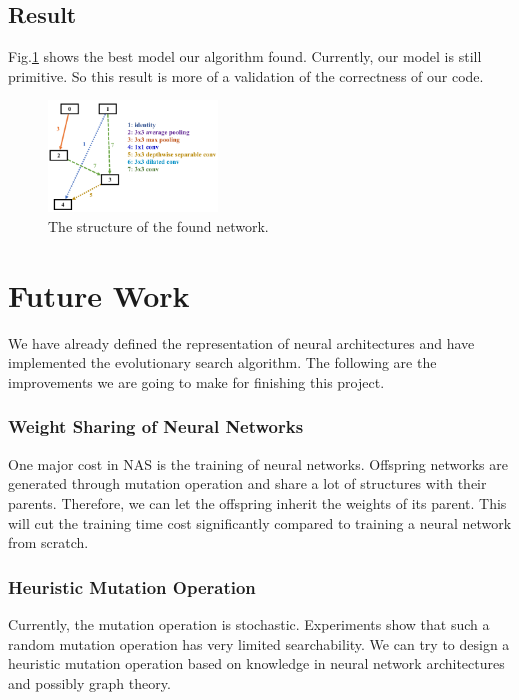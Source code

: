 \documentclass[conference]{IEEEtran}
\begin{document}
 \subsection{Result}

 Fig.\ref{found_artc} shows the best model our algorithm found. Currently, our model is still primitive. So this result is more of a validation of the correctness of our code.

\begin{figure}[H]
 	\centering
 	\includegraphics[width=0.4\textwidth]{figures/cellStruct.png}
   \caption{The structure of the found network. }\label{fig:digit}
   \label{found_artc}
  \end{figure}

  

 \section{Future Work}  

 We have already defined the representation of neural architectures and have implemented the evolutionary search algorithm. The following are the improvements we are going to make for finishing this project.
 
  
  \subsubsection{Weight Sharing of Neural Networks}    
  One major cost in NAS is the training of neural networks. Offspring networks are generated through mutation operation and share a lot of structures with their parents. Therefore, we can let the offspring inherit the weights of its parent. This will cut the training time cost significantly compared to training a neural network from scratch.
  
  \subsubsection{Heuristic Mutation Operation}
  Currently, the mutation operation is stochastic. Experiments show that such a random mutation operation has very limited searchability. We can try to design a heuristic mutation operation based on knowledge in neural network architectures and possibly graph theory.
  
\end{document}
